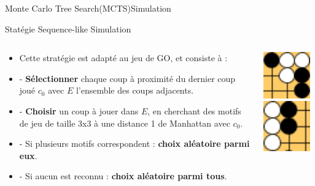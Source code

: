 \begin{frame}{Monte Carlo Tree Search(MCTS)}{Simulation}
	\begin{block}{Statégie Sequence-like Simulation}
		\begin{columns}
			\begin{column}{8cm}
				\begin{itemize}
					\item Cette stratégie est adapté au jeu de GO, et consiste à :
					\item - \textbf{Sélectionner} chaque coup à proximité du dernier coup joué $c_{0}$ avec $E$ l'ensemble des coups adjacents.
					\item - \textbf{Choisir} un coup à jouer dans $E$, en cherchant des motifs de jeu de taille 3x3 à une distance 1 de Manhattan avec $c_{0}$.
					\item - Si plusieurs motifs correspondent :
					\textbf{choix aléatoire parmi eux}.
					\item - Si aucun est reconnu :
					\textbf{choix aléatoire parmi tous}.
				\end{itemize}
			\end{column}
			\begin{column}{3cm}
				\vspace{1cm}
				\includegraphics[width=2cm]{ressources/MCTS/3x3GridGo.png}
				\includegraphics[width=2cm]{ressources/MCTS/3x3GridGo2.png}
			\end{column}
		\end{columns}
	\end{block}\end{frame}

